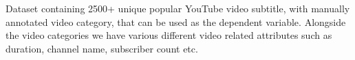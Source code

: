

Dataset containing 2500+ unique popular YouTube video subtitle, with manually annotated video category, that can be used as the dependent variable. Alongside the video categories we have various different video related attributes such as duration, channel name, subscriber count etc.

\href{https://www.kaggle.com/datasets/praneshmukhopadhyay/youtubers-saying-things}{}